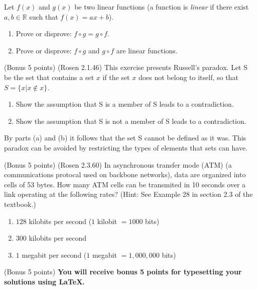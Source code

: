 \documentclass[10pt]{exam}
\begin{document}
\begin{questions}
\question[4] Let $f(x)$ and $g(x)$ be two linear functions (a function is \emph{linear} if there exist
$a, b \in \mathbb{R}$ such that $f(x) = ax + b$). 
 \begin{enumerate} [label=(\alph*)]
 \item Prove or disprove: $f\circ g = g\circ f$.
 \item Prove or disprove: $f \circ g$ and $g \circ f$ are linear functions.
 \end{enumerate}


\question (Bonus 5 points) (Rosen 2.1.46) This exercise presents Russell's paradox. Let S be the set that contains a set $x$ if the set $x$ does not belong to itself, so that $S = \{x | x  \notin x\}$.
\begin{enumerate} [label=(\alph*)]
 \item Show the assumption that S is a member of S leads to a contradiction.
\item Show the assumption that S is not a member of S leads to a contradiction.
 \end{enumerate}
By parts (a) and (b) it follows that the set S cannot be defined as it was. This paradox can be avoided by restricting the types of elements that sets can have.


\question (Bonus 5 points) (Rosen 2.3.60) In asynchronous transfer mode (ATM) (a communications protocal used on backbone networks), data are organized into cells of 53 bytes. How many ATM cells can be transmited in 10 seconds over a link operating at the following rates? (Hint: See Example 28 in section 2.3 of the textbook.)

\begin{enumerate} [label=(\alph*)]
 \item  $128$ kilobits per second ($1$ kilobit $= 1000$ bits)
 \item $300$ kilobits per second
 \item  $1$ megabit per second ($1$ megabit $= 1,000,000$ bits)
\end{enumerate}

\question (Bonus 5 points) \textbf{You will receive bonus 5 points for typesetting your solutions using \LaTeX.}


\end{questions}
\end{document}
